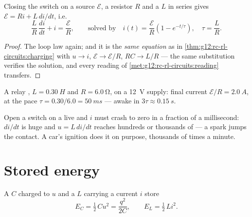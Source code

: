 \begin{proposition}\label{prop:g12:rc-rl-circuits:rl}
Closing the switch on a source $\mathcal{E}$, a resistor $R$ and a 
$L$ in series gives $\mathcal{E} = Ri + L\,di/dt$, i.e.
\[
\frac{L}{R}\,\frac{di}{dt} + i = \frac{\mathcal{E}}{R},
\qquad\text{solved by}\quad
i(t) = \frac{\mathcal{E}}{R}\left(1 - e^{-t/\tau}\right),
\quad \tau = \frac{L}{R} .
\]
\end{proposition}

\begin{proof}
The loop law again; and it is the \emph{same equation} as in
\cref{thm:g12:rc-rl-circuits:charging} with $u \to i$,
$\mathcal{E} \to \mathcal{E}/R$, $RC \to L/R$ --- the same substitution
verifies the solution, and every reading of
\cref{met:g12:rc-rl-circuits:reading} transfers.
\end{proof}

\begin{example}\label{ex:g12:rc-rl-circuits:rl}
A relay , $L = \qty{0.30}{H}$ and $R = \qty{6.0}{\ohm}$, on a
\qty{12}{V} supply: final current $\mathcal{E}/R = \qty{2.0}{A}$, at
the pace $\tau = 0.30/6.0 = \qty{50}{ms}$ --- awake in $3\tau \approx
\qty{0.15}{s}$.
\end{example}

\begin{remark}\label{rem:g12:rc-rl-circuits:spark}
Open a switch on a live  and $i$ must crash to zero in a fraction
of a millisecond: $di/dt$ is huge and $u = L\,di/dt$ reaches hundreds
or thousands of  --- a spark jumps the contact. A car's ignition
 does it on purpose, thousands of times a minute.
\end{remark}

\section{Stored energy}

\begin{proposition}\label{prop:g12:rc-rl-circuits:energy}
A  $C$ charged to  $u$ and a  $L$ carrying a current
$i$ store
\[
E_C = \tfrac12\,C u^2 = \frac{q^2}{2C},
\qquad
E_L = \tfrac12\,L i^2 .
\]
\end{proposition}

